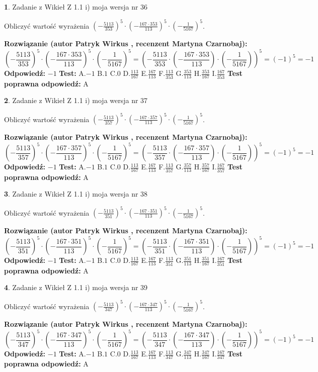 \documentclass[12pt, a4paper]{article}
\theoremstyle{definition} %
\newtheorem{zad}{}
\newcommand{\zadStart}[1]{\begin{zad}#1\newline}
\newcommand{\zadStop}{\end{zad}}
\newcommand{\rozwStart}[2]{\noindent \textbf{Rozwiązanie (autor #1 , recenzent #2): }\newline}
\newcommand{\rozwStop}{\newline}
\newcommand{\odpStart}{\noindent \textbf{Odpowiedź:}\newline}
\newcommand{\odpStop}{\newline}
\newcommand{\testStart}{\noindent \textbf{Test:}\newline}
\newcommand{\testStop}{\newline}
\newcommand{\kluczStart}{\noindent \textbf{Test poprawna odpowiedź:}\newline}
\newcommand{\kluczStop}{\newline}
\begin{document}
\zadStart{Zadanie z Wikieł Z 1.1 i) moja wersja nr 36}

Obliczyć wartość wyrażenia $(-\frac{5113}{353})^{5} \cdot (-\frac{167 \cdot 353}{113})^{5} \cdot (-\frac{1}{5167})^{5}$.
\zadStop
\rozwStart{Patryk Wirkus}{Martyna Czarnobaj}
$$(-\frac{5113}{353})^{5} \cdot (-\frac{167 \cdot 353}{113})^{5} \cdot (-\frac{1}{5167})^{5} = (-\frac{5113}{353} \cdot (-\frac{167 \cdot 353}{113}) \cdot (-\frac{1}{5167}))^{5} = (-1)^{5} = -1$$
\rozwStop
\odpStart
$-1$
\odpStop
\testStart
A.$-1$ B.$1$ C.$0$ D.$\frac{113}{167}$ E.$\frac{167}{113}$
F.$\frac{113}{353}$ G.$\frac{353}{113}$
H.$\frac{353}{167}$
I.$\frac{167}{353}$
\testStop
\kluczStart
A
\kluczStop



\zadStart{Zadanie z Wikieł Z 1.1 i) moja wersja nr 37}

Obliczyć wartość wyrażenia $(-\frac{5113}{357})^{5} \cdot (-\frac{167 \cdot 357}{113})^{5} \cdot (-\frac{1}{5167})^{5}$.
\zadStop
\rozwStart{Patryk Wirkus}{Martyna Czarnobaj}
$$(-\frac{5113}{357})^{5} \cdot (-\frac{167 \cdot 357}{113})^{5} \cdot (-\frac{1}{5167})^{5} = (-\frac{5113}{357} \cdot (-\frac{167 \cdot 357}{113}) \cdot (-\frac{1}{5167}))^{5} = (-1)^{5} = -1$$
\rozwStop
\odpStart
$-1$
\odpStop
\testStart
A.$-1$ B.$1$ C.$0$ D.$\frac{113}{167}$ E.$\frac{167}{113}$
F.$\frac{113}{357}$ G.$\frac{357}{113}$
H.$\frac{357}{167}$
I.$\frac{167}{357}$
\testStop
\kluczStart
A
\kluczStop



\zadStart{Zadanie z Wikieł Z 1.1 i) moja wersja nr 38}

Obliczyć wartość wyrażenia $(-\frac{5113}{351})^{5} \cdot (-\frac{167 \cdot 351}{113})^{5} \cdot (-\frac{1}{5167})^{5}$.
\zadStop
\rozwStart{Patryk Wirkus}{Martyna Czarnobaj}
$$(-\frac{5113}{351})^{5} \cdot (-\frac{167 \cdot 351}{113})^{5} \cdot (-\frac{1}{5167})^{5} = (-\frac{5113}{351} \cdot (-\frac{167 \cdot 351}{113}) \cdot (-\frac{1}{5167}))^{5} = (-1)^{5} = -1$$
\rozwStop
\odpStart
$-1$
\odpStop
\testStart
A.$-1$ B.$1$ C.$0$ D.$\frac{113}{167}$ E.$\frac{167}{113}$
F.$\frac{113}{351}$ G.$\frac{351}{113}$
H.$\frac{351}{167}$
I.$\frac{167}{351}$
\testStop
\kluczStart
A
\kluczStop



\zadStart{Zadanie z Wikieł Z 1.1 i) moja wersja nr 39}

Obliczyć wartość wyrażenia $(-\frac{5113}{347})^{5} \cdot (-\frac{167 \cdot 347}{113})^{5} \cdot (-\frac{1}{5167})^{5}$.
\zadStop
\rozwStart{Patryk Wirkus}{Martyna Czarnobaj}
$$(-\frac{5113}{347})^{5} \cdot (-\frac{167 \cdot 347}{113})^{5} \cdot (-\frac{1}{5167})^{5} = (-\frac{5113}{347} \cdot (-\frac{167 \cdot 347}{113}) \cdot (-\frac{1}{5167}))^{5} = (-1)^{5} = -1$$
\rozwStop
\odpStart
$-1$
\odpStop
\testStart
A.$-1$ B.$1$ C.$0$ D.$\frac{113}{167}$ E.$\frac{167}{113}$
F.$\frac{113}{347}$ G.$\frac{347}{113}$
H.$\frac{347}{167}$
I.$\frac{167}{347}$
\testStop
\kluczStart
A
\kluczStop
\end{document}
